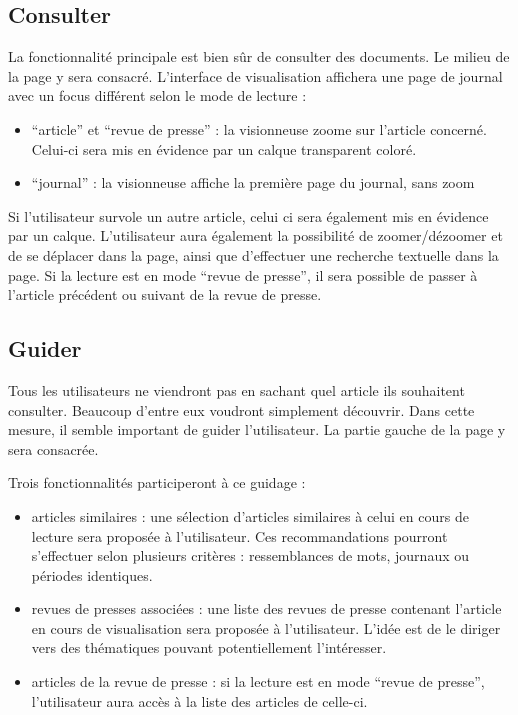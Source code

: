 \subsection{Consulter}
\label{sec:consultation_consulter}
La fonctionnalité principale est bien sûr de consulter des documents. Le milieu de la page y sera consacré.
L’interface de visualisation affichera une page de journal avec un focus différent selon le mode de lecture :
\begin{itemize}
\item “article” et “revue de presse” : la visionneuse zoome sur l’article concerné. Celui-ci sera mis en évidence par un calque transparent coloré.
\item “journal” : la visionneuse affiche la première page du journal, sans zoom
\end{itemize}
Si l’utilisateur survole un autre article, celui ci sera également mis en évidence par un calque.
	L’utilisateur aura également la possibilité de zoomer/dézoomer et de se déplacer dans la page, ainsi que d’effectuer une recherche textuelle dans la page. Si la lecture est en mode “revue de presse”, il sera possible de passer à l’article précédent ou suivant de la revue de presse.

\subsection{Guider}
\label{sec:consultation_guider}

	Tous les utilisateurs ne viendront pas en sachant quel article ils souhaitent consulter. Beaucoup d’entre eux voudront simplement découvrir. Dans cette mesure, il semble important de guider l’utilisateur. La partie gauche de la page y sera consacrée.

	Trois fonctionnalités participeront à ce guidage :
\begin{itemize}
\item articles similaires : une sélection d’articles similaires à celui en cours de lecture sera proposée à l’utilisateur. Ces recommandations pourront s’effectuer selon plusieurs critères : ressemblances de mots, journaux ou périodes identiques.
\item revues de presses associées : une liste des revues de presse contenant l’article en cours de visualisation sera proposée à l’utilisateur. L’idée est de le diriger vers des thématiques pouvant potentiellement l’intéresser.
\item articles de la revue de presse : si la lecture est en mode “revue de presse”, l’utilisateur aura accès à la liste des articles de celle-ci.
\end{itemize}